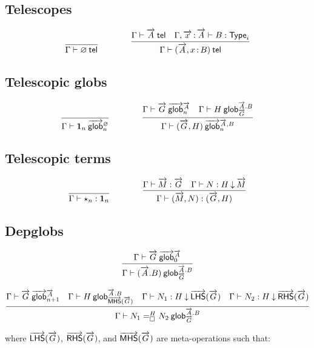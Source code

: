 \subsection{Telescopes}

\begin{small}
  \[
  \infer{\wftel{\Gamma}{\emptytel}}{}
  \qquad\qquad
  \infer
    {\wftel{\Gamma}{(\tel A,\tptm{x}{B})}}
    {\wftel{\Gamma}{\tel A}
    & \wftype{\Gamma,\teltm xA}{B}}
  \]
\end{small}

\subsection{Telescopic globs}

\begin{small}
  \[
  \infer
    {\wfglob{\Gamma}{\unitglob n}{\emptytel}n}
    {}
  \qquad\qquad
  \infer
    {\wfglob{\Gamma}{(\tel G,H)}{\tel A,B}n}
    {\wfglob{\Gamma}{\tel G}{\tel A}n
    &\wfdepglob{\Gamma}{H}{\tel A.B}{\tel G}}
  \]
\end{small}

\subsection{Telescopic terms}

\begin{small}
  \[
  \infer
    {\ofglob{\Gamma}{\unitglobelt n}{\unitglob n}}
    {}
  \qquad\qquad
  \infer
    {\ofglob{\Gamma}{(\tel M,N)}{(\tel G,H)}}
    {\ofglob{\Gamma}{\tel M}{\tel G}
    &\ofdepglob{\Gamma}{N}{H}{\tel M}}
  \]
\end{small}

\subsection{Depglobs}

\begin{small}
\[
\infer
  {\wfdepglob{\Gamma}{(\tel A.B)}{\tel{A}.B}{\tel{G}}}
  {\wfglob{\Gamma}{\tel G}{\tel A}0}
\]

\[
\infer
  {\wfdepglob{\Gamma}{\dhomj{H}{N_1}{N_2}{\blank}}{\tel A.B}{\tel G}}
  {\wfglob{\Gamma}{\tel G}{\tel A}{n+1}
  &\wfdepglob{\Gamma}{H}{\tel A.B}{\mhs{\tel G}}
  &\ofdepglob{\Gamma}{N_1}{H}{\lhs{\tel G}}
  &\ofdepglob{\Gamma}{N_2}{H}{\rhs{\tel G}}}
\]
\end{small}

where $\overrightarrow{\mathsf{LHS}}(\overrightarrow{G})$, $\overrightarrow{\mathsf{RHS}}(\overrightarrow{G})$, and $\overrightarrow{\mathsf{MHS}}(\overrightarrow{G})$ are meta-operations
such that:

